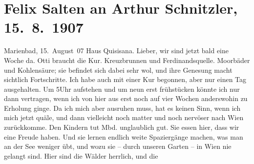                \section[Felix Salten an Arthur Schnitzler, 15. 8. 1907]{ Felix Salten an Arthur Schnitzler, 15. 8. 1907}\nopagebreak{}\rehead{ }\begin{ledgroupsized}[t]{13cm}\normalsize\beginnumbering \toendnotes[C]{\smallbreak\pagebreak[2]} 
\toendnotes[C]{\smallbreak}\pstart
           \raggedleft{}{\pb}Marienbad,
                     15. August 07\pend
           \pstart
           \raggedleft{}Haus Quisisana. \pend
           \pstart
           Lieber, wir sind jetzt bald eine Woche da. Otti braucht die Kur. Kreuzbrunnen und Ferdinandsquelle.
               Moorbäder und Kohlensäure; sie befindet sich dabei sehr wol, und ihre Genesung macht
               sichtlich Fortschritte. Ich habe auch mit einer Kur begonnen, aber nur einen Tag
               ausgehalten. Um 5Uhr aufstehen und um neun erst frühstücken könnte ich nur dann
               vertragen, wenn ich von hier aus erst noch auf vier Wochen anderswohin zu Erholung
               ginge. Da ich mich aber ausruhen muss, hat es keinen Sinn, wenn ich mich jetzt quäle,
               und dann vielleicht noch matter und noch nervöser nach Wien zurückkomme. Den Kindern tut Mbd. unglaublich gut. Sie essen hier, dass wir
               eine Freude haben. Und sie lernen endlich weite Spaziergänge machen, was man an der
               See weniger übt, und wozu sie – durch unseren Garten – in Wien nie gelangt sind. Hier sind die Wälder herrlich, und die

\end{ledgroupsized}
